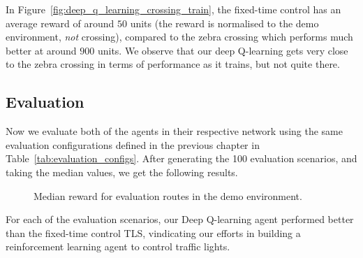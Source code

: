 \documentclass[a4paper]{report}
\begin{document}
In Figure~\ref{fig:deep_q_learning_crossing_train}, the fixed-time control has an average reward of around $50$ units (the reward is normalised to the demo environment, \emph{not} crossing), compared to the zebra crossing which performs much better at around $900$ units. We observe that our deep Q-learning gets very close to the zebra crossing in terms of performance as it trains, but not quite there.

\subsection{Evaluation}

Now we evaluate both of the agents in their respective network using the same evaluation configurations defined in the previous chapter in Table~\ref{tab:evaluation_configs}. After generating the 100 evaluation scenarios, and taking the median values, we get the following results.

\begin{figure}[H]
  \centering
  \caption{Median reward for evaluation routes in the demo environment.}
  \label{fig:deep_q_learning_demo_eval}
\end{figure}

For each of the evaluation scenarios, our Deep Q-learning agent performed better than the fixed-time control TLS, vindicating our efforts in building a reinforcement learning agent to control traffic lights.
\end{document}
